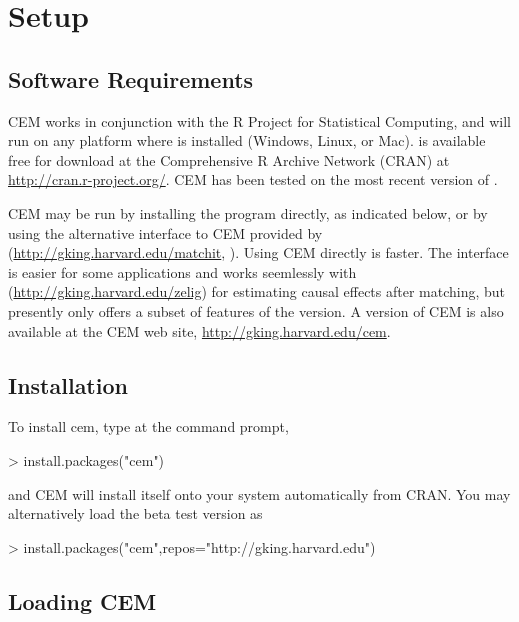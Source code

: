 \documentclass[article]{jss}
\begin{document}
\section{Setup}

\subsection{Software Requirements}

CEM works in conjunction with the R Project for Statistical Computing,
and will run on any platform where  is installed (Windows, Linux, or
Mac).   is available free for download at the Comprehensive R Archive
Network (CRAN) at \url{http://cran.r-project.org/}.  CEM has been
tested on the most recent version of .

CEM may be run by installing the program directly, as indicated below,
or by using the alternative interface to CEM provided by 
(\url{http://gking.harvard.edu/matchit}, \citep{HoImaKin07a}).  Using
CEM directly is faster.  The  interface is easier for some
applications and works seemlessly with 
(\url{http://gking.harvard.edu/zelig}) for estimating causal effects
after matching, but presently only offers a subset of features of the
 version.  A  version of CEM is also available at the CEM web
site, \url{http://gking.harvard.edu/cem}.

\subsection{Installation}\label{sec:install}

To install cem, type at the  command prompt,
\begin{Schunk}
\begin{Sinput}
> install.packages("cem")
\end{Sinput}
\end{Schunk}
and CEM will install itself onto your system automatically from CRAN.
You may alternatively load the beta test version as
\begin{Schunk}
\begin{Sinput}
> install.packages("cem",repos="http://gking.harvard.edu")
\end{Sinput}
\end{Schunk}

\subsection{Loading CEM} \label{sec:load}
\end{document}
